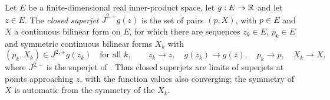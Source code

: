\begin{definition}
Let $E$ be a finite-dimensional real inner-product space, let $g:E\to\mathbb{R}$ and let
$z\in E$. The \emph{closed superjet} $\overline J^{2,+}g(z)$ is the set of pairs
$(p,X)$, with $p\in E$ and $X$ a continuous bilinear form on $E$, for
which there are sequences $z_k\in E$, $p_k\in E$ and symmetric continuous
bilinear forms $X_k$ with
\[
  (p_k,X_k)\in J^{2,+}g(z_k)\quad\text{for all }k,\qquad
  z_k\to z,\quad g(z_k)\to g(z),\quad p_k\to p,\quad X_k\to X,
\]
where $J^{2,+}$ is the superjet of . Thus closed superjets are
limits of superjets at points approaching $z$, with the function values also
converging; the symmetry of $X$ is automatic from the symmetry of the $X_k$.
\end{definition}
